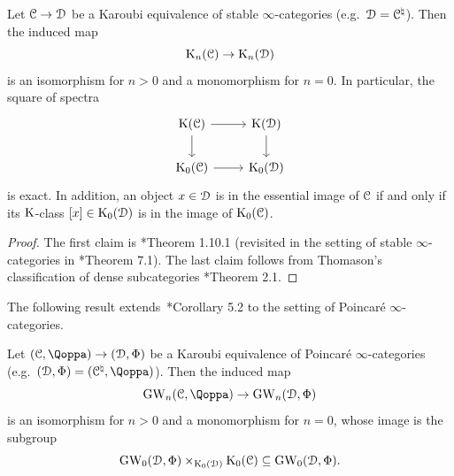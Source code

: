 \begin{proposition}
\label{proposition:cofinality-K-theory}%
Let $\mathcal C \to \mathcal{D}$ be a Karoubi equivalence of stable $\infty$-categories (e.g.\ $\mathcal{D} = \mathcal C^{\natural}$).
Then the induced map 
\[
\operatorname K_n(\mathcal C)\to \operatorname K_n(\mathcal{D})
\]
is an isomorphism for $n>0$ and a monomorphism for $n=0$. In particular, the square of spectra
\[
\begin{tikzcd}
\K(\C)\ar[r]\ar[d] & \K(\D)\ar[d]\\
\K_0(\C)\ar[r] & \K_0(\D)
\end{tikzcd}
\]
is exact. %
In addition, an object $x\in \mathcal{D}$ is in the essential image of $\mathcal C$ %
if and only if its $\operatorname K$-class $[x] \in \operatorname K_0(\mathcal{D})$ is in the image of $\operatorname K_0(\mathcal C)$. 
\end{proposition}
\begin{proof}
The first claim is %
\cite{thomason-trobaugh}*{Theorem 1.10.1} (revisited in the setting of stable $\infty$-categories in \cite{HLS}*{Theorem 7.1}). The last claim follows from Thomason's classification of dense subcategories \cite{thomason-classification}*{Theorem 2.1}. 
\end{proof}



The following result extends~\cite{schlichting-exact}*{Corollary 5.2} to the setting of Poincaré $\infty$-categories.
\begin{proposition}
\label{proposition:weak-cofinality}%
Let $(\C,\QF) \to (\D,\QFD)$ be a Karoubi equivalence of Poincaré $\infty$-categories (e.g.\ $(\D,\QFD) = (\C^\natural,\QF)$).
Then the induced map
\[
\GW_n(\C,\QF)\to \GW_n(\D,\QFD)
\]
is an isomorphism for $n>0$ and a monomorphism for $n=0$, whose image is the subgroup
\[
\operatorname{GW}_0(\mathcal{D},\Phi) \times_{\operatorname K_0(\mathcal{D})}\operatorname K_0(\mathcal C)\subseteq \operatorname{GW}_0(\mathcal{D},\Phi) .
\]
\end{proposition}


